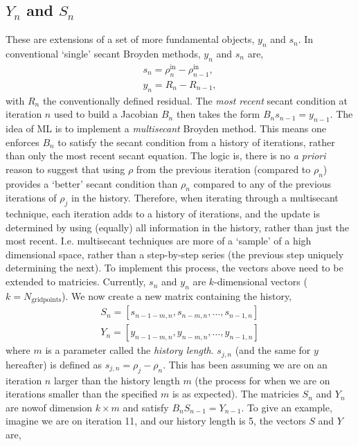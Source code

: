 \subsection{$Y_n$ and $S_n$}
These are extensions of a set of more fundamental objects, $y_n$ and $s_n$. In conventional `single' secant Broyden methods, $y_n$ and $s_n$ are,
\begin{gather}
s_n = \rho^{\text{in}}_{n} - \rho^{\text{in}}_{n-1}, \\
y_n = R_n - R_{n-1},
\end{gather}
with $R_n$ the conventionally defined residual. The \textit{most recent} secant condition at iteration $n$ used to build a Jacobian $B_n$ then takes the form $B_n s_{n-1} = y_{n-1}$. The idea of ML is to implement a \textit{multisecant} Broyden method. This means one enforces $B_n$ to satisfy the secant condition from a history of iterations, rather than only the most recent secant equation. The logic is, there is no \textit{a priori} reason to suggest that using $\rho$ from the previous iteration (compared to $\rho_n$) provides a `better' secant condition than $\rho_n$ compared to any of the previous iterations of $\rho_j$ in the history. Therefore, when iterating through a multisecant technique, each iteration adds to a history of iterations, and the update is determined by using (equally) all information in the history, rather than just the most recent. I.e. multisecant techniques are more of a `sample' of a high dimensional space, rather than a step-by-step series (the previous step uniquely determining the next). To implement this process, the vectors above need to be extended to matricies. Currently, $s_n$ and $y_n$ are $k$-dimensional vectors ($k = N_{\text{gridpoints}}$). We now create a new matrix containing the history, 
\begin{gather}
S_n = [ s_{n-1-m,n},  s_{n-m,n}, \dots ,  s_{n-1,n} ] \\
Y_n = [ y_{n-1-m,n},  y_{n-m,n}, \dots ,  y_{n-1,n} ]
\end{gather}
where $m$ is a parameter called the \textit{history length}. $s_{j,n}$ (and the same for $y$ hereafter) is defined as $s_{j,n} = \rho_j - \rho_n$. This has been assuming we are on an iteration $n$ larger than the history length $m$ (the process for when we are on iterations smaller than the specified $m$ is as expected). The matricies $S_n$ and $Y_n$ are nowof dimension $k \times m$ and satisfy  $B_n S_{n-1} = Y_{n-1}$. To give an example, imagine we are on iteration 11, and our history length is 5, the vectors $S$ and $Y$ are,
